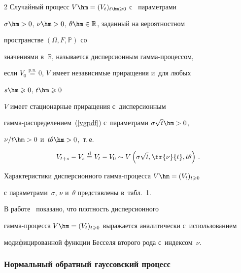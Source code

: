 \begin{multicols}{2}
        Случайный  процесс  $V \hm= (V_t)_{t \hm\geqslant 0} $  с~ параметрами        


$\sigma\hm >0$, $\nu \hm> 0$, $\theta \hm\in \mathbb{R} $, заданный на вероятностном 


пространстве $ (\Omega, F, \mathbb{P}) $ со


        значениями в~$ \mathbb{R}$, называется дисперсионным гам\-ма-про\-цес\-сом, 


если $V_0\overset{\mathrm{p.n.}}{=} 0$, $V$ имеет независимые приращения и~для любых 


$s \hm\geqslant 0$, $t \hm\geqslant 0$ 


$V$ имеет стационарные приращения с~дисперсионным 


гам\-ма-рас\-пре\-де\-ле\-ни\-ем~(\ref{vgpdf}) с~параметрами $\sigma \sqrt{t}\hm > 0$, 


$\nu/t \hm> 0$ и~$t \theta\hm > 0$,~т.\,е.\


$$


V_{t+s} - V_s \overset{\mathrm{d}}{=} V_t - V_0 \sim 


V\left(\sigma \sqrt{t}, \fr{\nu}{t}, t \theta\right) \,.


$$





\smallskip





        Характеристики дисперсионного гам\-ма-про\-цес\-са $V \hm= (V_t)_{t \geqslant 0}$ 


с параметрами~$\sigma$, $\nu$ и~$\theta$ представлены в~табл.~1.








       


        В работе~\cite{madancarr} показано, что плотность дисперсионного 


        гамма-процесса  $V \hm= (V_t)_{t \geqslant 0}$ выражается аналитически с~использованием 


модифицированной функции Бесселя второго рода с~индексом~$\nu$.





        \subsubsection {Нормальный обратный гауссовский процесс}






\end{multicols}
